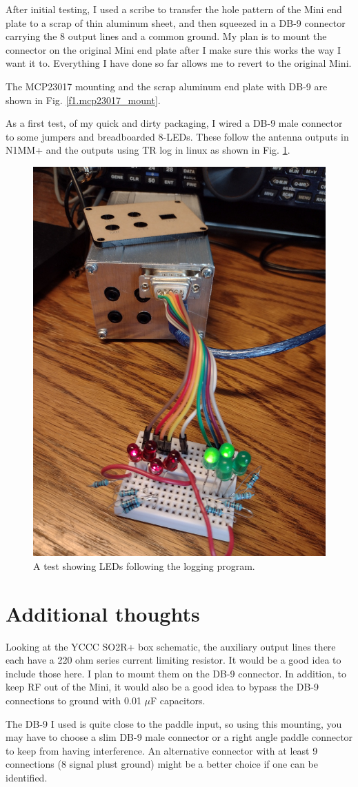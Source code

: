 \documentclass[12pt]{article}
\begin{document}
After initial testing, I
used a scribe to transfer the hole pattern of the Mini
end plate to a scrap of thin aluminum sheet, and then squeezed in a DB-9
connector carrying the 8 output lines and a common ground. My plan is to
mount the connector on the original Mini end plate after I make sure this
works the way I want it to. Everything I have done so far allows me to
revert to the original Mini.

The MCP23017 mounting and the scrap aluminum end plate with
DB-9  are shown in
Fig. \ref{f1.mcp23017_mount}.

As a first test, of my quick and dirty packaging,
I wired a DB-9 male connector to some jumpers and
breadboarded 8-LEDs. These follow the antenna outputs in N1MM+ and
the outputs using TR log in linux as shown in Fig. \ref{f2.leds}.
\begin{figure}[htb]
\includegraphics[width=.5\textwidth]{led_test_1.jpg}
\caption{A test showing LEDs following the logging program.}
\label{f2.leds}
\end{figure}

\section{Additional thoughts}
Looking at the YCCC SO2R+ box schematic, the auxiliary output lines there
each have a 220 ohm series current limiting resistor. It would be a good
idea to include those here. I plan to mount them on the DB-9 connector.
In addition, to keep RF out of the Mini, it would also
be a good idea to bypass the DB-9 connections to ground
with 0.01 $\mu$F capacitors.

The DB-9 I used is quite close to the paddle input, so using this mounting,
you may have to choose a slim DB-9 male connector or a right angle
paddle connector to keep from having interference. An alternative connector
with at least 9 connections (8 signal plust ground)
might be a better choice if one can be identified.
\end{document}
